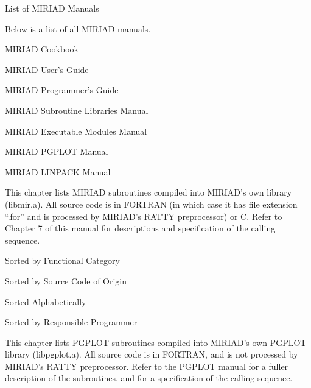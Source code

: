 \beginsection List of MIRIAD Manuals
\par Below is a list of all MIRIAD manuals. \par
\medskip\par{\parindent=0.5cm
MIRIAD Cookbook                    \par
MIRIAD User's Guide                \par
MIRIAD Programmer's Guide          \par
MIRIAD Subroutine Libraries Manual \par
MIRIAD Executable Modules Manual   \par
MIRIAD PGPLOT Manual               \par
MIRIAD LINPACK Manual              \par
}

\endchapter

This chapter lists MIRIAD subroutines compiled into MIRIAD's
own library (libmir.a). All source code is in FORTRAN (in which case it
has file extension ``.for'' and is processed by MIRIAD's RATTY
preprocessor) or C. Refer to Chapter 7 of this manual for descriptions
and specification of the calling sequence.

\beginsection Sorted by Functional Category
\par

\beginsection Sorted by Source Code of Origin
\par

\beginsection Sorted Alphabetically
\par

\beginsection Sorted by Responsible Programmer
\par

\endchapter

This chapter lists PGPLOT subroutines compiled into MIRIAD's
own PGPLOT library (libpgplot.a).  All source code is in FORTRAN,
and is not processed by MIRIAD's RATTY preprocessor.  Refer to
the PGPLOT manual for a fuller description of the subroutines, and
for a specification of the calling sequence.

